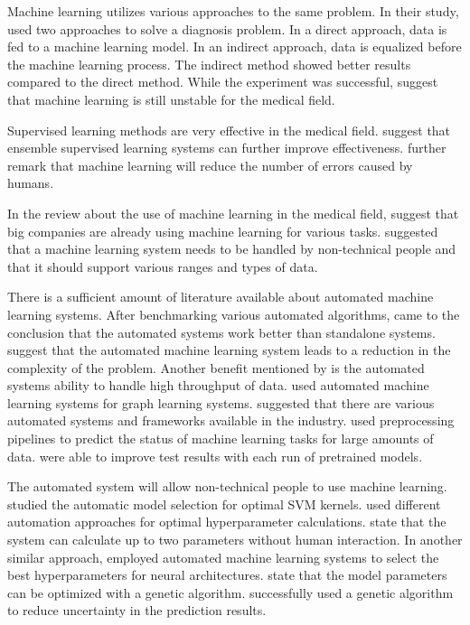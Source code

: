 \documentclass[a4paper,fleqn]{cas-dc}
\begin{document}
Machine learning utilizes various approaches to the same problem. In their study, \cite*{ref_paper_8} used two approaches to solve a diagnosis problem. In a direct approach, data is fed to a machine learning model. In an indirect approach, data is equalized before the machine learning process. The indirect method showed better results compared to the direct method. While the experiment was successful, \citeauthor{ref_paper_8} suggest that machine learning is still unstable for the medical field.

Supervised learning methods are very effective in the medical field. \cite*{ref_paper_11} suggest that ensemble supervised learning systems can further improve effectiveness. \citeauthor{ref_paper_11} further remark that machine learning will reduce the number of errors caused by humans.

In the review about the use of machine learning in the medical field, \cite*{ref_paper_33} suggest that big companies are already using machine learning for various tasks. \citeauthor{ref_paper_33} suggested that a machine learning system needs to be handled by non-technical people and that it should support various ranges and types of data.

There is a sufficient amount of literature available about automated machine learning systems. After benchmarking various automated algorithms, \cite{ref_paper_a_5} came to the conclusion that the automated systems work better than standalone systems. \cite{ref_paper_a_1} suggest that the automated machine learning system leads to a reduction in the complexity of the problem. Another benefit mentioned by \cite{ref_paper_a_3} is the automated systems ability to handle high throughput of data. \cite{ref_paper_a_4} used automated machine learning systems for graph learning systems. \citeauthor{ref_paper_a_4} suggested that there are various automated systems and frameworks available in the industry. \cite{ref_paper_a_12} used preprocessing pipelines to predict the status of machine learning tasks for large amounts of data. \citeauthor{ref_paper_a_12} were able to improve test results with each run of pretrained models.

The automated system will allow non-technical people to use machine learning. \cite*{ref_paper_3} studied the automatic model selection for optimal SVM kernels. \citeauthor{ref_paper_3} used different automation approaches for optimal hyperparameter calculations. \citeauthor{ref_paper_3} state that the system can calculate up to two parameters without human interaction. In another similar approach, \cite{ref_paper_a_14} employed automated machine learning systems to select the best hyperparameters for neural architectures. \cite*{ref_paper_39} state that the model parameters can be optimized with a genetic algorithm. \citeauthor{ref_paper_39} successfully used a genetic algorithm to reduce uncertainty in the prediction results.
\end{document}
